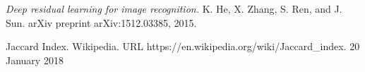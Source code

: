 \documentclass[a4paper, twoside]{article}
\begin{document}
\begin{thebibliography}{99}
	\textit{Deep residual learning for image recognition.}
    K. He, X. Zhang, S. Ren, and J. Sun. 
    arXiv preprint arXiv:1512.03385, 2015.

    
	Jaccard Index. Wikipedia.
    URL https://en.wikipedia.org/wiki/Jaccard{\_}index. 
    20 January 2018




\end{thebibliography}
\end{document}
